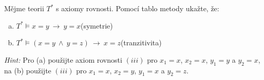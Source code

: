 \begin{problem} 
    
    Mějme teorii $T^*$ s axiomy rovnosti. Pomocí tablo metody ukažte, že:
    \begin{enumerate}[(a)]
        \item $T^*\models x=y\ \to\ y=x$\hfill(symetrie)
        \item $T^*\models (x=y\ \wedge\ y=z)\ \to\ x=z$\hfill(tranzitivita)
    \end{enumerate}
    {\it Hint:} Pro (a) použijte axiom rovnosti $(iii)$ pro $x_1=x$, $x_2=x$, $y_1=y$ a $y_2=x$, \newline
        na (b) použijte $(iii)$ pro $x_1=x$, $x_2=y$, $y_1=x$ a $y_2=z$.
        
\end{problem}
  



